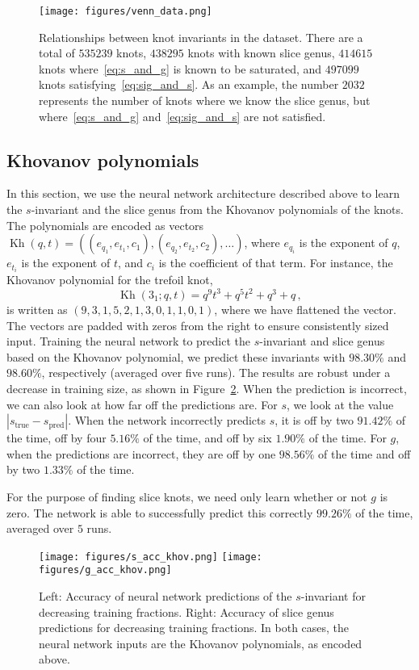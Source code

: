 \documentclass[11pt]{article}
\DeclareMathOperator{\Kh}{Kh}
\numberwithin{equation}{section}
\begin{document}
\begin{figure}
    \centering
    \texttt{[image: figures/venn\_data.png]}
    \caption{\small{Relationships between knot invariants in the dataset. There are a total of $535239$ knots, $438295$ knots with known slice genus, $414615$ knots where~\eqref{eq:s_and_g} is known to be saturated, and $497099$ knots satisfying~\eqref{eq:sig_and_s}. As an example, the number $2032$ represents the number of knots where we know the slice genus, but where~\eqref{eq:s_and_g} and~\eqref{eq:sig_and_s} are not satisfied.}}
    \label{fig:data_venn}
\end{figure}

\subsection{Khovanov polynomials}
In this section, we use the neural network architecture described above to learn the $s$-invariant and the slice genus from the Khovanov polynomials of the knots. The polynomials are encoded as vectors $\Kh(q,t) = ((e_{q_1}, e_{t_1}, c_{1}), (e_{q_2}, e_{t_2}, c_2), \ldots)$, where $e_{q_i}$ is the exponent of $q$, $e_{t_i}$ is the exponent of $t$, and $c_i$ is the coefficient of that term.
For instance, the Khovanov polynomial for the trefoil knot,
\begin{equation}
    \Kh(3_1;q,t) = q^9 t^3 + q^5 t^2 + q^3 + q \,, \label{eq:kh31}
\end{equation}
is written as $(9,3,1,5,2,1,3,0,1,1,0,1)$, where we have flattened the vector. The vectors are padded with zeros from the right to ensure consistently sized input.
Training the neural network to predict the $s$-invariant and slice genus based on the Khovanov polynomial, we predict these invariants with $98.30\%$ and $98.60\%$, respectively (averaged over five runs).
The results are robust under a decrease in training size, as shown in Figure~\ref{fig:accs_k}. When the prediction is incorrect, we can also look at how far off the predictions are. For $s$, we look at the value $|s_\text{true}-s_\text{pred}|$. When the network incorrectly predicts $s$, it is off by two $91.42\%$ of the time, off by four $5.16\%$ of the time, and off by six $1.90\%$ of the time. For $g$, when the predictions are incorrect, they are off by one $98.56\%$ of the time and off by two $1.33\%$ of the time.

For the purpose of finding slice knots, we need only learn whether or not $g$ is zero. The network is able to successfully predict this correctly $99.26\%$ of the time, averaged over $5$ runs.
\begin{figure}[h!]
    \centering
    \texttt{[image: figures/s\_acc\_khov.png]}
    \texttt{[image: figures/g\_acc\_khov.png]}
    \caption{\small{Left: Accuracy of neural network predictions of the $s$-invariant for decreasing training fractions. Right: Accuracy of slice genus predictions for decreasing training fractions. In both cases, the neural network inputs are the Khovanov polynomials, as encoded above.}}
    \label{fig:accs_k}
\end{figure}
\end{document}
